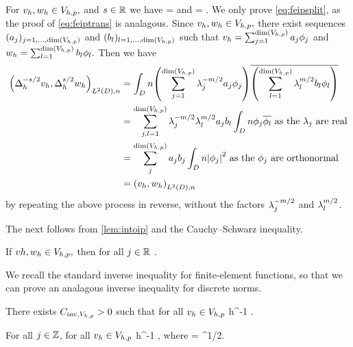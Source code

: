 \label{lem:intoip}
For $v_{h}, w_{h} \in V_{h,p},$ and $s \in \mathbb R$ we have
\beq\label{eq:feipsplit}
\IPLtDn{\Deltahmst \vh}{\Deltahst \wh} = \IPLtDn{\vh}{\wh}
\eeq
and
\beq\label{eq:feiptrans}
\IPLtDn{\Deltahst \vh}{\Deltahst \vh} =  .
\eeq
\ele
{}
We only prove \cref{eq:feipsplit}, as the proof of \cref{eq:feiptrans} is analagous. Since $v_{h},w_{h} \in V_{h,p},$ there exist sequences $(\aj)_{j =1,\ldots,\dimVhp}$ and $(\bsl)_{l =1,\ldots,\dimVhp}$ such that $\vh = \sum_{j=1}^{\dimVhp} \aj\phij$ and $\wh = \sum_{l=1}^{\dimVhp} \bsl \phil.$ Then we have
\begin{align*}
\IPLtDn{\Deltahmst \vh}{\Deltahst \wh} &= \int_D n\mleft(\sum_{j=1}^{\dimVhp}\lambdaj^{-m/2} \aj\phij\mright)\overline{\mleft(\sum_{l=1}^{\dimVhp} \lambdal^{m/2}\bsl \phil\mright)}\\
&= \sum_{j,l=1}^{\dimVhp} \lambdaj^{-m/2} \lambdal^{m/2} \aj \bsl \int_D n \phij \philbar \text{ as the } \lambdaj \text{ are real}\\
& =\sum_{j}^{\dimVhp} \aj \bsj \int_D n\abs{\phij}^2 \text{ as the } \phij \text{ are orthonormal}\\
&= \IPLtDn{\vh}{\wh}
\end{align*}
by repeating the above process in reverse, without the factors $\lambda_{j}^{-m/2}$ and $\lambda_{l}^{m/2}$.
\epf

The next  follows from \cref{lem:intoip} and the Cauchy--Schwarz inequality.

\label{cor:ipdiscbound}
If $vh, w_{h} \in V_{h,p},$ then for all $j \in \mathbb R$
\beqs
\IPLtDn{\vh}{\wh} \leq \Njh{\vh}\Nmjh{\wh}.
\eeqs
\eco

We recall the standard inverse inequality for finite-element functions, so that we can prove an analagous inverse inequality for discrete norms.

\label{lem:inverseinequality}
There exists $C_{\mathrm{inv},V_{h,p}} > 0$ such that for all $v_{h} \in V_{h,p}$
\beqs
\NHoD{\vh} \leq \CinvVhp h^{-1} \NLtD{\vh}.
\eeqs
\ele



\label{lem:inversediscrete}
For all $j \in \mathbb Z$, for all $v_{h} \in V_{h,p}$
\beqs
\Njhn{\vh} \leq \Chinv {} h^{-1} \Njmohn{\vh},
\eeqs
where
\beqs
\Chinv = \CinvVhp {}^{1/2}.
\eeqs
\ele

